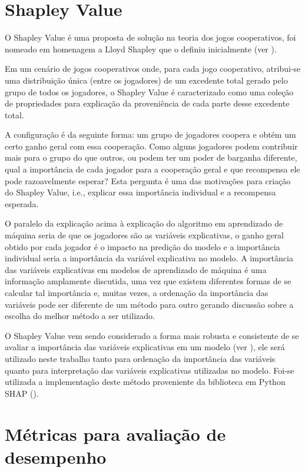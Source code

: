 \section{Shapley Value}
\label{sec:shapley_value}

O Shapley Value é uma proposta de solução na teoria dos jogos cooperativos, foi nomeado em homenagem a Lloyd Shapley que o definiu inicialmente (ver \citet{Shapley1953}).

Em um cenário de jogos cooperativos onde, para cada jogo cooperativo, atribui-se uma distribuição única (entre os jogadores) de um excedente total gerado pelo grupo de todos os jogadores, o Shapley Value é caracterizado como uma coleção de propriedades para explicação da proveniência de cada parte desse excedente total.

A configuração é da seguinte forma: um grupo de jogadores coopera e obtém um certo ganho geral com essa cooperação. Como alguns jogadores podem contribuir mais para o grupo do que outros, ou podem ter um poder de barganha diferente, qual a importância de cada jogador para a cooperação geral e que recompensa ele pode razoavelmente esperar? Esta pergunta é uma das motivações para criação do Shapley Value, i.e., explicar essa importância individual e a recompensa esperada.

O paralelo da explicação acima à explicação do algoritmo em aprendizado de máquina seria de que os jogadores são as variáveis explicativas, o ganho geral obtido por cada jogador é o impacto na predição do modelo e a importância individual seria a importância da variável explicativa no modelo. A importância das variáveis explicativas em modelos de aprendizado de máquina é uma informação amplamente discutida, uma vez que existem diferentes formas de se calcular tal importância e, muitas vezes, a ordenação da importância das variáveis pode ser diferente de um método para outro gerando discussão sobre a escolha do melhor método a ser utilizado.

O Shapley Value vem sendo considerado a forma mais robusta e consistente de se avaliar a importância das variáveis explicativas em um modelo (ver \citet{Lundberg2017}), ele será utilizado neste trabalho tanto para ordenação da importância das variáveis quanto para interpretação das variáveis explicativas utilizadas no modelo. Foi-se utilizada a implementação deste método proveniente da biblioteca em Python SHAP (\citet{Shap}).

\section{Métricas para avaliação de desempenho}
\label{sec:metricas_avaliacao}

